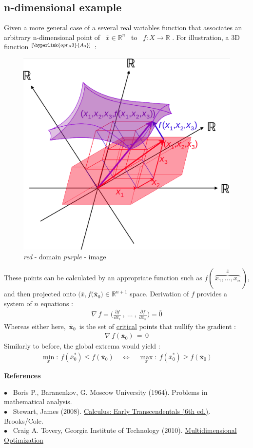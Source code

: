 \documentclass[12pt]{article}
\newcommand\tab[1][1cm]{\hspace*{#1}}
\numberwithin{equation}{section}
\begin{document}
\begin{flushleft}
\subsection*{n-dimensional example}
Given a more general case of a several real variables function that associates an arbitrary n-dimensional point of \, $\bar{{x}} \in \mathbb{R}^n$ \, to \, $f : X \rightarrow \mathbb{R}$ . For illustration, a 3D function $^{[\hyperlink{opt_A3}{A_{\text{3}}}]}$ :
\begin{figure}[H]
\centering
\includegraphics[width=0.425 \linewidth, center]{n_dimensional.png}
\caption*{\textit{red} - domain \tab \textit{purple} - image}
\end{figure}
These points can be calculated by an appropriate function such as $f (\, \overbrace{x_1, \hdots, x_n}^{\bar{x}} \,)$, and then projected onto $\big( \bar{{x}}, f(\bar{\textbf{x}}_0 \big) \in \mathbb{R}^{n+1}$ space. Derivation of $f$ provides a system of $n$ equations :
\begin{align*}
\nabla \, f = \Big( \frac{\partial f}{\partial x_1} \, , \ \hdots \ , \,  \frac{\partial f}{\partial x_n} \Big) = \bar{0}
\end{align*}
Whereas either here, \,$\bar{\textbf{x}}_0$\, is the set of \underline{critical} points that nullify the gradient :
\begin{align*}
\nabla \, f( \bar{\textbf{x}}_0 ) \, = \, 0
\end{align*}
Similarly to before, the global extrema would yield :
\begin{align*}
\min_x : \ f(\bar{x}_0^*) \leq f(\bar{\textbf{x}}_0)  \quad \Leftrightarrow \quad \max_x : \  f(\bar{x}_0^*) \geq f(\bar{\textbf{x}}_0)
\end{align*}

\textbf{References}

$\bullet$ \ \hypertarget{opt_A1}{Boris P.}, Baranenkov, G. Moscow University (1964). Problems in mathematical analysis.  \\
$\bullet$ \ \hypertarget{opt_A2}{Stewart, James} (2008). \href{https://archive.org/details/calculusearlytra00stew_1}{Calculus: Early Transcendentals (6th ed.)}. Brooks/Cole. \\
$\bullet$ \ \hypertarget{opt_A3}{Craig A.} Tovery, Georgia Institute of Technology (2010). \href{https://www.extremeoptimization.com/Documentation/Mathematics/Optimization/Multidimensional-Optimization.aspx}{Multidimensional Optimization}


\end{flushleft}
\end{document}
